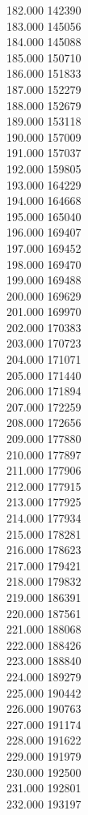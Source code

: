 { 182.000	142390 \\
 183.000	145056 \\
 184.000	145088 \\
 185.000	150710 \\
 186.000	151833 \\
 187.000	152279 \\
 188.000	152679 \\
 189.000	153118 \\
 190.000	157009 \\
 191.000	157037 \\
 192.000	159805 \\
 193.000	164229 \\
 194.000	164668 \\
 195.000	165040 \\
 196.000	169407 \\
 197.000	169452 \\
 198.000	169470 \\
 199.000	169488 \\
 200.000	169629 \\
 201.000	169970 \\
 202.000	170383 \\
 203.000	170723 \\
 204.000	171071 \\
 205.000	171440 \\
 206.000	171894 \\
 207.000	172259 \\
 208.000	172656 \\
 209.000	177880 \\
 210.000	177897 \\
 211.000	177906 \\
 212.000	177915 \\
 213.000	177925 \\
 214.000	177934 \\
 215.000	178281 \\
 216.000	178623 \\
 217.000	179421 \\
 218.000	179832 \\
 219.000	186391 \\
 220.000	187561 \\
 221.000	188068 \\
 222.000	188426 \\
 223.000	188840 \\
 224.000	189279 \\
 225.000	190442 \\
 226.000	190763 \\
 227.000	191174 \\
 228.000	191622 \\
 229.000	191979 \\
 230.000	192500 \\
 231.000	192801 \\
 232.000	193197 \\
}

